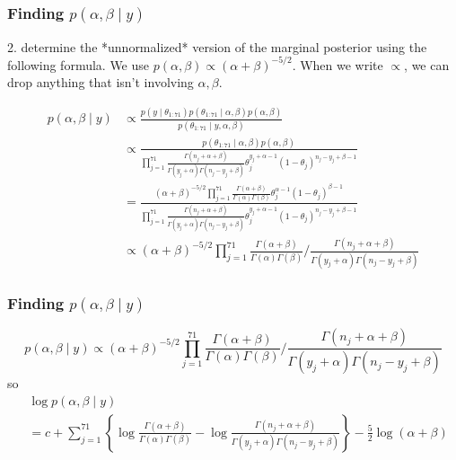 \documentclass{beamer}
\begin{document}
\begin{frame}
\frametitle{Finding $p(\alpha,\beta \mid y)$ }

2. determine the *unnormalized* version of the marginal posterior using the following formula. We use $p(\alpha, \beta) \propto (\alpha + \beta)^{-5/2}$. When we write $\propto$, we can drop anything that isn't involving $\alpha, \beta$.

\begin{align*}
p(\alpha, \beta \mid y) &\propto \frac{p(y \mid \theta_{1:71})p(\theta_{1:71} \mid \alpha, \beta)p(\alpha, \beta) }{p(\theta_{1:71} \mid y, \alpha, \beta) } \tag{earlier slides} \\
&\propto \frac{p(\theta_{1:71} \mid \alpha, \beta)p(\alpha, \beta) }{ \prod_{j=1}^{71}\frac{\Gamma(n_j + \alpha + \beta )}{ \Gamma(y_j+\alpha)\Gamma(n_j - y_j + \beta) }\theta_j^{y_j+\alpha-1}(1-\theta_j)^{n_j - y_j + \beta-1} } \\
&= \frac{ (\alpha + \beta)^{-5/2} \prod_{j=1}^{71} \frac{\Gamma(\alpha + \beta )}{ \Gamma(\alpha)\Gamma( \beta) } \theta_j^{\alpha-1}(1-\theta_j)^{\beta-1}  }{ \prod_{j=1}^{71}\frac{\Gamma(n_j + \alpha + \beta )}{ \Gamma(y_j+\alpha)\Gamma(n_j - y_j + \beta) }\theta_j^{y_j+\alpha-1}(1-\theta_j)^{n_j - y_j + \beta-1} } \\
&\propto(\alpha + \beta)^{-5/2} \prod_{j=1}^{71} \frac{\Gamma(\alpha + \beta )}{ \Gamma(\alpha)\Gamma( \beta) } \bigg/ \frac{\Gamma(n_j + \alpha + \beta )}{ \Gamma(y_j+\alpha)\Gamma(n_j - y_j + \beta) } 
\end{align*}

\end{frame}

\begin{frame}
\frametitle{Finding $p(\alpha,\beta \mid y)$ }

\[
p(\alpha, \beta \mid y) \propto (\alpha + \beta)^{-5/2} \prod_{j=1}^{71} \frac{\Gamma(\alpha + \beta )}{ \Gamma(\alpha)\Gamma( \beta) } \bigg/ \frac{\Gamma(n_j + \alpha + \beta )}{ \Gamma(y_j+\alpha)\Gamma(n_j - y_j + \beta) }
\]
so
\begin{align*}
&\log p(\alpha, \beta \mid y) \\
&= c +  \sum_{j=1}^{71} \left\{ \log  \frac{\Gamma(\alpha + \beta )}{ \Gamma(\alpha)\Gamma( \beta) } - \log \frac{\Gamma(n_j + \alpha + \beta )}{ \Gamma(y_j+\alpha)\Gamma(n_j - y_j + \beta) } \right\} - \frac{5}{2} \log (\alpha + \beta)\\
\end{align*}
\end{frame}
\end{document}
